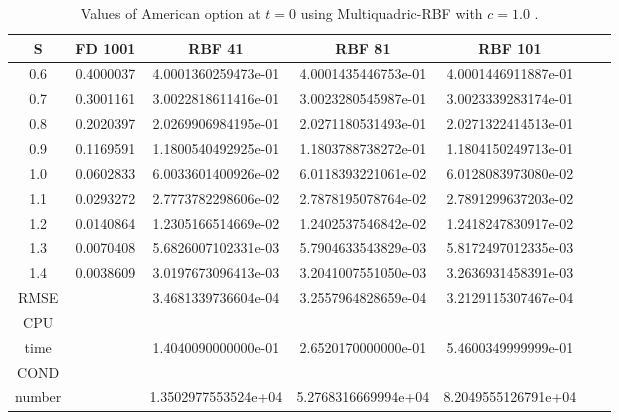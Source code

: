 \documentclass[12pt]{article}
\numberwithin{equation}{section} %
\begin{document}
\newpage
\begin{table}[h]
\centering
\begin{tabular}{|c|c|c|c|c|c|c|}
  \hline
  S & FD 1001  & RBF 41 & RBF 81 & RBF 101 \\
  \hline
  0.6 & 0.4000037 &4.0001360259473e-01  &   4.0001435446753e-01&  4.0001446911887e-01 \\
  0.7 & 0.3001161  & 3.0022818611416e-01 &   3.0023280545987e-01&3.0023339283174e-01 \\
  0.8 & 0.2020397  & 2.0269906984195e-01 & 2.0271180531493e-01 & 2.0271322414513e-01 \\
  0.9 & 0.1169591  & 1.1800540492925e-01  &  1.1803788738272e-01 &1.1804150249713e-01 \\
  1.0 & 0.0602833  & 6.0033601400926e-02 &  6.0118393221061e-02& 6.0128083973080e-02 \\
  1.1 & 0.0293272  & 2.7773782298606e-02  & 2.7878195078764e-02 &2.7891299637203e-02 \\
  1.2 & 0.0140864  & 1.2305166514669e-02 & 1.2402537546842e-02 & 1.2418247830917e-02 \\
  1.3 & 0.0070408  &  5.6826007102331e-03 &   5.7904633543829e-03& 5.8172497012335e-03 \\
  1.4 & 0.0038609  & 3.0197673096413e-03 & 3.2041007551050e-03 & 3.2636931458391e-03  \\
  \hline
  RMSE &   & 3.4681339736604e-04 &  3.2557964828659e-04 &  3.2129115307467e-04 \\
  \hline
  CPU &   &  &  &  \\
  time  &   & 1.4040090000000e-01  &   2.6520170000000e-01&  5.4600349999999e-01\\
  \hline
   COND &   &  &  &  \\
  number  &   & 1.3502977553524e+04  &  5.2768316669994e+04&  8.2049555126791e+04 \\
  \hline
\end{tabular}
  \caption{Values of American option at $t=0$ using Multiquadric-RBF with $c=1.0$ .}\label{Tab_1DFinal}
\end{table}
\end{document}
